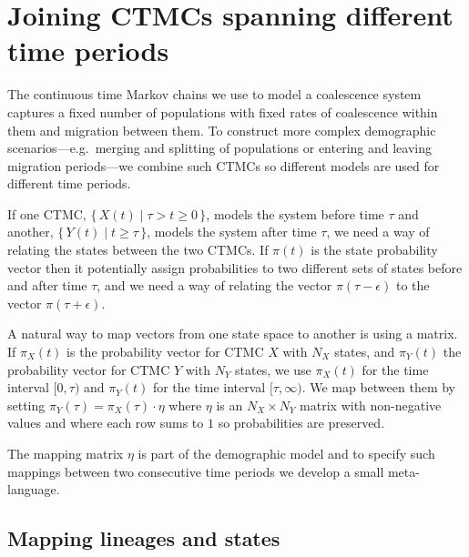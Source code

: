\chapter{Joining CTMCs spanning different time periods}
\label{chap:composing-CTMCs}

The continuous time Markov chains we use to model a coalescence system captures a fixed number of populations with fixed rates of coalescence within them and migration between them. To construct more complex demographic scenarios---e.g.\ merging and splitting of populations or entering and leaving migration periods---we combine such CTMCs so different models are used for different time periods.

If one CTMC, $\{\,X(t)\;|\;\tau>t\geq 0\,\}$, models the system before time $\tau$ and another, $\{\,Y(t)\;|\;t\geq\tau\,\}$, models the system after time $\tau$, we need a way of relating the states between the two CTMCs. If $\pi(t)$ is the state probability vector then it potentially assign probabilities to two different sets of states before and after time $\tau$, and we need a way of relating the vector $\pi(\tau-\epsilon)$ to the vector $\pi(\tau+\epsilon)$.

A natural way to map vectors from one state space to another is using a matrix. If $\pi_X(t)$ is the probability vector for CTMC $X$ with $N_X$ states, and $\pi_Y(t)$ the probability vector for CTMC $Y$ with $N_Y$ states, we use $\pi_X(t)$ for the time interval $[0,\tau)$ and $\pi_Y(t)$ for the time interval $[\tau,\infty)$. We map between them by setting $\pi_Y(\tau)=\pi_X(\tau)\cdot\eta$ where $\eta$ is an $N_X\times N_Y$ matrix with non-negative values and where each row sums to $1$ so probabilities are preserved.

The mapping matrix $\eta$ is part of the demographic model and to specify such mappings between two consecutive time periods we develop a small meta-language.

\section{Mapping lineages and states}

